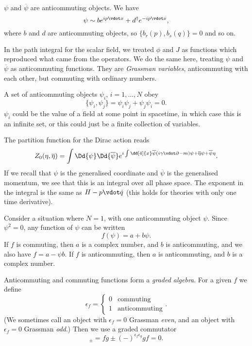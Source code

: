 \documentclass{jknotes} %
\begin{document}
\(\psi\) and \(\overline{\psi}\) are anticommuting objects. We have
\begin{equation}
    \psi \sim be^{ip\vdot x}+d^\dagger e^{-ip\vdot x},
\end{equation}
where \(b\) and \(d\) are anticommuting objects, so \(\{b_r(p),b_s(q)\}=0\) and so on.

In the path integral for the scalar field, we treated \(\phi\) and \(J\) as functions which reproduced what came from the operators. We do the same here, treating \(\psi\) and \(\overline{\psi}\) as anticommuting functions. They are \emph{Grassman variables}, anticommuting with each other, but commuting with ordinary numbers.

A set of anticommuting objects \(\psi_i\), \(i=1,\dots,N\) obey
\begin{equation}
    \{\psi_i,\psi_j\}=\psi_i\psi_j + \psi_j\psi_i = 0.
\end{equation}
\(\psi_i\) could be the value of a field at some point in spacetime, in which case this is an infinite set, or this could just be a finite collection of variables.

The partition function for the Dirac action reads
\begin{equation}
    Z_0(\eta,\overline{\eta}) = \int\Dd{\psi}\Dd{\overline{\psi}}e^{i\int\dd[4]{x}\overline{\psi}(i\gamma\vdot\partial-m)\psi + \overline{\eta}\psi + \overline{\psi}\eta}.
\end{equation}
If we recall that \(\psi\) is the generalised coordinate and \(\overline{\psi}\) is the generalised momentum, we see that this is an integral over all phase space. The exponent in the integral is the same as \(H-p\vdot \dot{q}\) (this holds for theories with only one time derivative).

Consider a situation where \(N=1\), with one anticommuting object \(\psi\). Since \(\psi^2=0\), any function of \(\psi\) can be written 
\begin{equation}
    f(\psi) = a+b\psi.
\end{equation}
If \(f\) is commuting, then \(a\) is a complex number, and \(b\) is anticommuting, and we also have \(f=a-\psi b\). If \(f\) is anticommuting, then \(a\) is anticommuting, and \(b\) is a complex number. 

Anticommuting and commuting functions form a \emph{graded algebra}. For a given \(f\) we define
\begin{equation}
    \epsilon_f =
    \begin{cases}
        0 & \text{commuting} \\
        1 & \text{anticommuting}
    \end{cases}.
\end{equation}
(We sometimes call an object with \(\epsilon_f=0\) Grassman \emph{even}, and an object with \(\epsilon_f=0\) Grassman \emph{odd}.) Then we use a graded commutator
\begin{equation}
    [f,g]_\pm = fg \pm (-)^{\epsilon_f\epsilon_g}gf = 0.
\end{equation}
\end{document}
